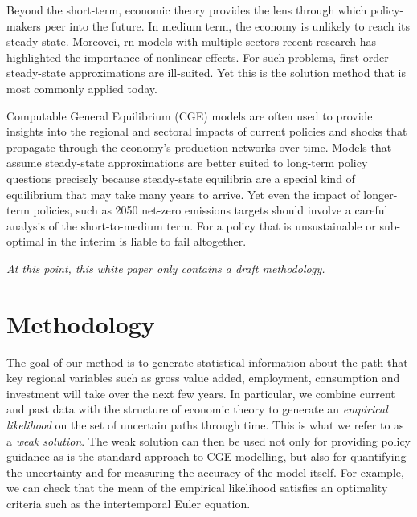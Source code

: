 \documentclass[12pt,a4paper,twoside, draft]{article}
\begin{document}
Beyond the short-term, economic theory provides the lens through which
policy-makers peer into the future. 
In medium term, the economy is unlikely to reach its steady state. 
Moreovei, rn models with multiple sectors recent research has highlighted
the importance of nonlinear effects.
For such problems, first-order steady-state approximations are ill-suited.
Yet this is the solution method that is most commonly applied today.

Computable General Equilibrium (CGE)
models are often used to provide insights into the regional and sectoral
impacts of current policies and shocks that propagate through the economy's
production networks over time.
Models that assume steady-state approximations are better suited to
long-term policy questions precisely because steady-state equilibria are a
special kind of equilibrium that may take many years to arrive.
Yet even the impact of longer-term policies, such as 2050 net-zero emissions
targets should involve a careful analysis of the short-to-medium term.
For a policy that is unsustainable or sub-optimal in the interim is liable to
fail altogether.

\emph{At this point, this white paper only contains a draft methodology.}

\section{Methodology}\label{sec-methodology}
The goal of our method is to generate statistical information about the path
that key regional variables such as gross value added, employment, consumption
and investment will take over the next few years.
In particular, we combine current and past data with the structure of economic
theory to generate an \emph{empirical likelihood}
\citet{Owen-Empirical_likelihood} on the set of uncertain paths through time.
This is what we refer to as a \emph{weak solution}.
The weak solution can then be used not only for providing policy guidance as is
the standard approach to CGE modelling, but also for quantifying the
uncertainty and for measuring the accuracy of the model itself.
For example, we can check that the mean of the empirical likelihood
satisfies an optimality criteria such as the intertemporal Euler equation. 
\end{document}
